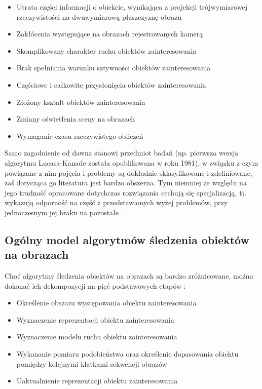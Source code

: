 \begin{itemize}

	\item Utrata części informacji o obiekcie, wynikająca z projekcji trójwymiarowej rzeczywistości na dwuwymiarową płaszczyznę obrazu
	\item Zakłócenia występujące na obrazach rejestrowanych kamerą
	\item Skomplikowany charakter ruchu obiektów zainteresowania
	\item Brak spełniania warunku sztywności obiektów zainteresowania
	\item Częściowe i całkowite przysłonięcia obiektów zainteresowania
	\item Złożony kształt obiektów  zainteresowania
	\item Zmiany oświetlenia sceny na obrazach
	\item Wymaganie czasu rzeczywistego obliczeń

\end{itemize}  

Samo zagadnienie od dawna stanowi przedmiot badań (np. pierwsza wersja algorytmu Lucasa-Kanade została opublikowana w roku 1981), w związku z czym powiązane z nim pojęcia i problemy są dokładnie sklasyfikowane i zdefiniowane, zaś dotycząca go literatura jest bardzo obszerna. Tym niemniej ze względu na jego trudność opracowane dotychczas rozwiązania cechują się specjalizacją, tj. wykazują odporność na część z przedstawionych wyżej problemów, przy jednoczesnym jej braku na pozostałe \cite{Smeulders2010}.

\subsection{Ogólny model algorytmów śledzenia obiektów na obrazach}
\label{subsec:Ogolny_model_algorytmow_sledzenia_obiektow_na_obrazach}

Choć algorytmy śledzenia obiektów na obrazach są bardzo zróżnicowane, można dokonać ich dekompozycji na pięć podstawowych etapów \cite{Smeulders2010}:

\begin{itemize}
	\item Określenie obszaru występowania obiektu zainteresowania
	\item Wyznaczenie reprezentacji obiektu zainteresowania
	\item Wyznaczenie modelu ruchu obiektu zainteresowania
	\item Wykonanie pomiaru podobieństwa oraz określenie dopasowania obiektu pomiędzy kolejnymi klatkami sekwencji obrazów
	\item Uaktualnienie reprezentacji obiektu zainteresowania
\end{itemize}
 
